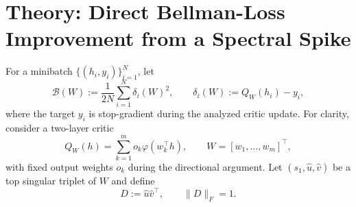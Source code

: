 
\section{Theory: Direct Bellman-Loss Improvement from a Spectral Spike}
\label{sec:direct-spike-theory}

For a minibatch $\{(h_i,y_i)\}_{i=1}^N$, let
\begin{equation}
    \mathcal B(W)
    :=\frac{1}{2N}\sum_{i=1}^N\delta_i(W)^2,
    \qquad
    \delta_i(W):=Q_W(h_i)-y_i,
    \label{eq:fixed-target-bellman-loss}
\end{equation}
where the target $y_i$ is stop-gradient during the analyzed critic update.  For
clarity, consider a two-layer critic
\begin{equation}
    Q_W(h)=\sum_{k=1}^m o_k\varphi(w_k^\top h),
    \qquad W=[w_1,\ldots,w_m]^\top,
    \label{eq:critic}
\end{equation}
with fixed output weights $o_k$ during the directional argument.  Let
$(s_1,\hat u,\hat v)$ be a top singular triplet of $W$ and define
\begin{equation}
    D:=\hat u\hat v^\top,
    \qquad \|D\|_F=1.
    \label{eq:spike-direction}
\end{equation}

